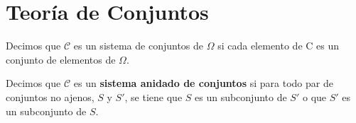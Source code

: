 \chapter{Teoría de Conjuntos}

\begin{dfn}
\label{conj1}
Decimos que $\mathcal{C}$ es un sistema de conjuntos de $\Omega$ si cada elemento de C es un conjunto de elementos de $\Omega$.
\end{dfn}

\begin{dfn} \cite{Todo}
\label{conj2}
Decimos que $\mathcal{C}$ es un \textbf{sistema anidado de conjuntos} si para todo par de conjuntos no ajenos, $S$ y $S'$, 
se tiene que $S$ es un subconjunto de $S'$ o que $S'$ es un subconjunto de $S$.
\end{dfn}